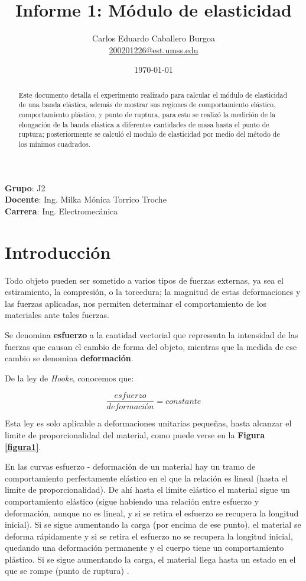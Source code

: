 \documentclass[letter,11pt]{article}
\title{Informe 1: Módulo de elasticidad}
\author{Carlos Eduardo Caballero Burgoa \\
    \small{\href{mailto:200201226@est.umss.edu}{200201226@est.umss.edu}}
}
\date{\today}
\begin{document}
\maketitle
\begin{center}
    \textbf{Grupo}: J2\\
    \textbf{Docente}: Ing. Milka Mónica Torrico Troche\\
    \textbf{Carrera}: Ing. Electromecánica
\end{center}

\begin{abstract}
    Este documento detalla el experimento realizado para calcular el módulo de
    elasticidad de una banda elástica, además de mostrar sus regiones de
    comportamiento elástico, comportamiento plástico, y punto de ruptura, para
    esto se realizó la medición de la elongación de la banda elástica a
    diferentes cantidades de masa hasta el punto de ruptura; posteriormente se
    calculó el modulo de elasticidad por medio del método de los mínimos
    cuadrados.
\end{abstract}

\section{Introducción}

Todo objeto pueden ser sometido a varios tipos de fuerzas externas, ya sea el
estiramiento, la compresión, o la torcedura; la magnitud de estas deformaciones
y las fuerzas aplicadas, nos permiten determinar el comportamiento de los
materiales ante tales fuerzas.

Se denomina \textbf{esfuerzo} a la cantidad vectorial que representa la
intensidad de las fuerzas que causan el cambio de forma del objeto, mientras que
la medida de ese cambio se denomina \textbf{deformación}.

De la ley de \emph{Hooke}, conocemos que:

\begin{equation}
    \frac{esfuerzo}{deformación} = constante
\label{hooke}
\end{equation}
\vspace{0.25cm}

Esta ley es solo aplicable a deformaciones unitarias pequeñas, hasta alcanzar
el limite de proporcionalidad del material, como puede verse en la
\textbf{Figura \ref{figura1}}.
\vspace{0.25cm}

En las curvas esfuerzo - deformación de un material hay un tramo de
comportamiento perfectamente elástico en el que la relación es lineal (hasta el
limite de proporcionalidad). De ahí hasta el límite elástico el material sigue
un comportamiento elástico (sigue habiendo una relación entre esfuerzo y
deformación, aunque no es lineal, y si se retira el esfuerzo se recupera la
longitud inicial). Si se sigue aumentando la carga (por encima de ese punto), el
material se deforma rápidamente y si se retira el esfuerzo no se recupera la
longitud inicial, quedando una deformación permanente y el cuerpo tiene un
comportamiento plástico. Si se sigue aumentando la carga, el material llega
hasta un estado en el que se rompe (punto de ruptura) \cite{Sears y Zemansky}.
\end{document}
